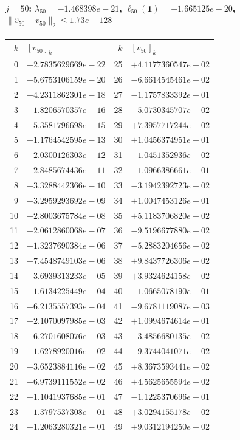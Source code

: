 \documentclass[11pt]{article}
\begin{document}
\paragraph{$j = 50$: $\lambda_{50} = -1.468398e-21$, \quad $\ell_{50}(\mathbf{1}) = +1.665125e-20$, \quad $\|\hat{v}_{50} - v_{50}\|_2 \leq 1.73e-128$}
\begin{center}
{\footnotesize
\begin{tabular}{r@{\;\;}l@{\quad}r@{\;\;}l}
\toprule
$k$ & $[v_{50}]_k$ & $k$ & $[v_{50}]_k$ \\
\midrule
0 & $+2.7835629669e-22$ & 25 & $+4.1177360547e-02$ \\
1 & $+5.6753106159e-20$ & 26 & $-6.6614545461e-02$ \\
2 & $+4.2311862301e-18$ & 27 & $-1.1757833392e-01$ \\
3 & $+1.8206570357e-16$ & 28 & $-5.0730345707e-02$ \\
4 & $+5.3581796698e-15$ & 29 & $+7.3957717244e-02$ \\
5 & $+1.1764542595e-13$ & 30 & $+1.0456374951e-01$ \\
6 & $+2.0300126303e-12$ & 31 & $-1.0451352936e-02$ \\
7 & $+2.8485674436e-11$ & 32 & $-1.0966386661e-01$ \\
8 & $+3.3288442366e-10$ & 33 & $-3.1942392723e-02$ \\
9 & $+3.2959293692e-09$ & 34 & $+1.0047453126e-01$ \\
10 & $+2.8003675784e-08$ & 35 & $+5.1183706820e-02$ \\
11 & $+2.0612860068e-07$ & 36 & $-9.5196677880e-02$ \\
12 & $+1.3237690384e-06$ & 37 & $-5.2883204656e-02$ \\
13 & $+7.4548749103e-06$ & 38 & $+9.8437726306e-02$ \\
14 & $+3.6939313233e-05$ & 39 & $+3.9324624158e-02$ \\
15 & $+1.6134225449e-04$ & 40 & $-1.0665078190e-01$ \\
16 & $+6.2135557393e-04$ & 41 & $-9.6781119087e-03$ \\
17 & $+2.1070097985e-03$ & 42 & $+1.0994674614e-01$ \\
18 & $+6.2701608076e-03$ & 43 & $-3.4856680135e-02$ \\
19 & $+1.6278920016e-02$ & 44 & $-9.3744041071e-02$ \\
20 & $+3.6523884116e-02$ & 45 & $+8.3673593441e-02$ \\
21 & $+6.9739111552e-02$ & 46 & $+4.5625655594e-02$ \\
22 & $+1.1041937685e-01$ & 47 & $-1.1225370696e-01$ \\
23 & $+1.3797537308e-01$ & 48 & $+3.0294155178e-02$ \\
24 & $+1.2063280321e-01$ & 49 & $+9.0312194250e-02$ \\
\bottomrule
\end{tabular}
}
\end{center}
\end{document}

